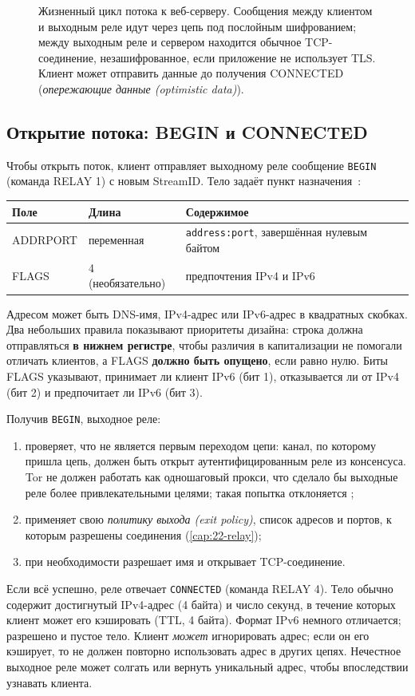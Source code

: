 \begin{figure}[htbp]
\centering

\caption{Жизненный цикл потока к веб-серверу. Сообщения между клиентом и выходным реле идут через цепь под послойным шифрованием; между выходным реле и сервером находится обычное TCP-соединение, незашифрованное, если приложение не использует TLS. Клиент может отправить данные до получения CONNECTED (\emph{опережающие данные (optimistic data)}).}
\label{fig:stream}
\end{figure}

\subsection{Открытие потока: BEGIN и CONNECTED}

Чтобы открыть поток, клиент отправляет выходному реле сообщение \texttt{BEGIN} (команда RELAY 1) с новым StreamID. Тело задаёт пункт назначения~:
\begin{center}
\begin{tabular}{lll}
\toprule
Поле & Длина & Содержимое \\
\midrule
ADDRPORT & переменная & \texttt{address:port}, завершённая нулевым байтом \\
FLAGS & 4 (необязательно) & предпочтения IPv4 и IPv6 \\
\bottomrule
\end{tabular}
\end{center}
Адресом может быть DNS-имя, IPv4-адрес или IPv6-адрес в квадратных скобках. Два небольших правила показывают приоритеты дизайна: строка должна отправляться \textbf{в нижнем регистре}, чтобы различия в капитализации не помогали отличать клиентов, а FLAGS \textbf{должно быть опущено}, если равно нулю. Биты FLAGS указывают, принимает ли клиент IPv6 (бит 1), отказывается ли от IPv4 (бит 2) и предпочитает ли IPv6 (бит 3).

Получив \texttt{BEGIN}, выходное реле:
\begin{enumerate}
  \item проверяет, что не является первым переходом цепи: канал, по которому пришла цепь, должен быть открыт аутентифицированным реле из консенсуса. Tor не должен работать как одношаговый прокси, что сделало бы выходные реле более привлекательными целями; такая попытка отклоняется ;
  \item применяет свою \emph{политику выхода (exit policy)}, список адресов и портов, к которым разрешены соединения (\cref{cap:22-relay});
  \item при необходимости разрешает имя и открывает TCP-соединение.
\end{enumerate}
Если всё успешно, реле отвечает \texttt{CONNECTED} (команда RELAY 4). Тело обычно содержит достигнутый IPv4-адрес (4 байта) и число секунд, в течение которых клиент может его кэшировать (TTL, 4 байта). Формат IPv6 немного отличается; разрешено и пустое тело. Клиент \emph{может} игнорировать адрес; если он его кэширует, то не должен повторно использовать адрес в других цепях. Нечестное выходное реле может солгать или вернуть уникальный адрес, чтобы впоследствии узнавать клиента.

